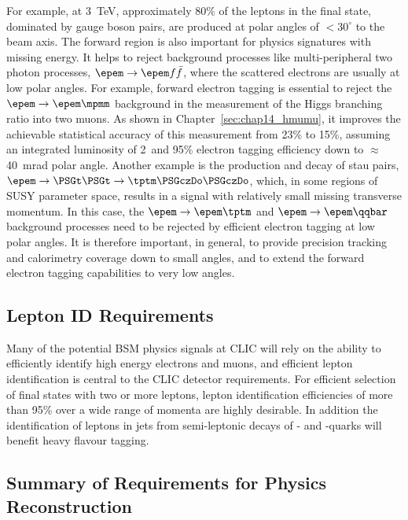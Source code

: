 For example, at 3~TeV, approximately 80\% of the leptons
in the \llll final state, dominated by gauge boson pairs, are produced at polar angles of $<30^\circ$ to the beam axis.
The forward region is also important for physics signatures with missing energy. It helps to reject background processes like
multi-peripheral two photon processes, $\epem \to \epem f\bar{f}$, where the scattered electrons are usually at low polar angles.
For example, forward electron tagging is essential to reject the $\epem \to \epem\mpmm$ background in the measurement of the Higgs branching ratio into two muons.
As shown in Chapter~\ref{sec:chap14_hmumu}, it improves the achievable statistical accuracy of this measurement from 23\% to 15\%, assuming an integrated luminosity of 2~\abinv and 95\% electron tagging efficiency down to $\approx$ 40~mrad polar angle.
Another example is the production and decay of stau pairs, $\epem\rightarrow\PSGt\PSGt\rightarrow\tptm\PSGczDo\PSGczDo$,
which, in some regions of \acs{SUSY} parameter space, results in a signal with relatively small missing transverse momentum.
In this case, the $\epem \to \epem\tptm$ and $\epem \to \epem\qqbar$ background processes need to be rejected by efficient
electron tagging at low polar angles. It is therefore important, in general, to provide precision tracking and calorimetry coverage down to small angles, and to extend the forward electron tagging capabilities to very low angles.

\subsection{Lepton ID Requirements\label{sec:chapter3:requirements:leptonID}}

Many of the potential \acs{BSM} physics signals at CLIC will rely on the ability to
efficiently identify high energy electrons and muons, and
efficient lepton identification is central to the CLIC detector requirements.
For efficient selection of final states with two or more leptons, lepton
identification efficiencies of more than 95\% over a wide range of momenta are highly
desirable. In addition the identification of leptons in jets from
semi-leptonic decays of \PQb- and \PQc-quarks will benefit heavy flavour tagging.

\subsection{Summary of Requirements for Physics Reconstruction}

